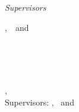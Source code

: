 \begin{titlepage}
	\vfill
	\begin{minipage}[t]{.27\textwidth}
		\raggedleft
		\textit{Supervisors}
	\end{minipage}
	\hspace*{15pt}
	\begin{minipage}[t]{.65\textwidth}
		\thesisFirstSupervisor,\ \thesisSecondSupervisor\ and\ \thesisThirdSupervisor
	\end{minipage} \\[10mm]


\end{titlepage}


\hfill
\vfill
{
	\small
	\textbf{\thesisName} \\
	\textit{\thesisTitle} \\
	\thesisSubject, \thesisDate \\
	Supervisors: \thesisFirstSupervisor, \thesisSecondSupervisor \ and \thesisThirdSupervisor \\[1.5em]
	\textbf{\thesisUniversity} \\
	\textit{\thesisUniversityGroup} \\
	\thesisUniversityInstitute \\
	\thesisUniversityDepartment \\
	\thesisUniversityStreetAddress \\
	\thesisUniversityPostalCode\ \thesisUniversityCity
}
